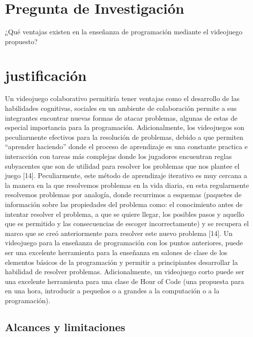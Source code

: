 \section{Pregunta de Investigación}
¿Qué ventajas existen en la enseñanza de programación mediante el videojuego propuesto?

\section{justificación}
Un videojuego colaborativo permitiría tener ventajas como el desarrollo de las habilidades cognitivas, sociales en un ambiente de colaboración permite a sus integrantes encontrar nuevas formas de atacar problemas, algunas de estas de especial importancia para la programación. 
Adicionalmente, los videojuegos son peculiarmente efectivos para la resolución de problemas, debido a que permiten “aprender haciendo” donde el proceso de aprendizaje es una constante practica e interacción con tareas más complejas donde los jugadores encuentran reglas subyacentes que son de utilidad para resolver los problemas que nos plantee el juego [14]. Peculiarmente, este método de aprendizaje iterativo es muy cercana a la manera en la que resolvemos problemas en la vida diaria, en esta regularmente resolvemos problemas por analogía, donde recurrimos a esquemas (paquetes de información sobre las propiedades del problema como: el conocimiento antes de intentar resolver el problema, a que se quiere llegar, los posibles pasos y aquello que es permitido y las consecuencias de escoger incorrectamente) y se recupera el marco que se creó anteriormente para resolver este nuevo problema [14].
Un videojuego para la enseñanza de programación con los puntos anteriores, puede ser una excelente herramienta para la enseñanza en salones de clase de los elementos básicos de la programación y permitir a principiantes desarrollar la habilidad de resolver problemas. Adicionalmente, un videojuego corto puede ser una excelente herramienta para una clase de Hour of Code (una propuesta para en una hora, introducir a pequeños o a grandes a la computación o a la programación).


\subsection{Alcances y limitaciones}